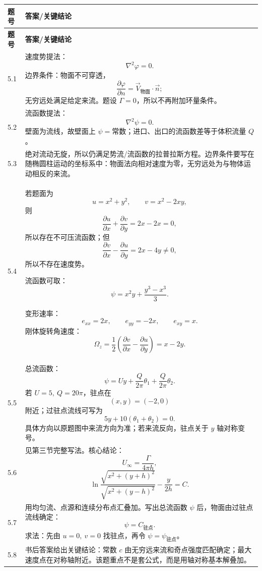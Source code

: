 ﻿\documentclass[UTF8,zihao=-4]{ctexart}
\begin{document}
\begin{longtable}{p{1.3cm}p{12.6cm}}
\toprule
\textbf{题号} & \textbf{答案/关键结论}\\
\midrule
\endfirsthead
\toprule
\textbf{题号} & \textbf{答案/关键结论}\\
\midrule
\endhead

5.1 &
速度势提法：
\[
\nabla^2\varphi=0.
\]
边界条件：物面不可穿透，
\[
\frac{\partial\varphi}{\partial n}=\vec V_{\text{物面}}\cdot\vec n;
\]
无穷远处满足给定来流。题设 $\Gamma=0$，所以不再附加环量条件。\\

5.2 &
流函数提法：
\[
\nabla^2\psi=0.
\]
壁面为流线，故壁面上 $\psi=\text{常数}$；进口、出口的流函数差等于体积流量 $Q$。\\

5.3 &
绝对流动无旋，所以仍满足势流/流函数的拉普拉斯方程。边界条件要写在随椭圆柱运动的坐标系中：物面法向相对速度为零，无穷远处为与物体运动相反的来流。\\

5.4 &
若题面为
\[
u=x^2+y^2,\qquad v=x^2-2xy,
\]
则
\[
\frac{\partial u}{\partial x}+\frac{\partial v}{\partial y}=2x-2x=0,
\]
所以存在不可压流函数；但
\[
\frac{\partial v}{\partial x}-\frac{\partial u}{\partial y}
=2x-4y\ne0,
\]
所以不存在速度势。

流函数可取：
\[
\psi=x^2y+\frac{y^3-x^3}{3}.
\]

变形速率：
\[
e_{xx}=2x,\qquad e_{yy}=-2x,\qquad e_{xy}=x.
\]
刚体旋转角速度：
\[
\Omega_z=\frac12\left(\frac{\partial v}{\partial x}-\frac{\partial u}{\partial y}\right)=x-2y.
\]\\

5.5 &
总流函数：
\[
\psi=Uy+\frac{Q}{2\pi}\theta_1+\frac{Q}{2\pi}\theta_2.
\]
若 $U=5,\ Q=20\pi$，驻点在
\[
(x,y)=(-2,0)
\]
附近；过驻点流线可写为
\[
5y+10(\theta_1+\theta_2)=0.
\]
具体方向以原题图中来流方向为准；若来流反向，驻点关于 $y$ 轴对称变号。\\

5.6 &
见第三节完整写法。核心结论：
\[
U_\infty=\frac{\Gamma}{4\pi h},
\]
\[
\ln\frac{\sqrt{x^2+(y+h)^2}}{\sqrt{x^2+(y-h)^2}}
-\frac{y}{2h}=C.
\]\\

5.7 &
用均匀流、点源和连续分布点汇叠加。写出总流函数 $\psi$ 后，物面由过驻点流线确定：
\[
\psi=C_{\text{驻点}}.
\]
求法：先由 $u=0,\ v=0$ 找驻点，再令 $\psi=\psi_{\text{驻点}}$。\\

5.8 &
书后答案给出关键结论：常数 $c$ 由无穷远来流和奇点强度匹配确定；最大速度点在对称轴附近。该题重点不是套公式，而是用轴对称基本解叠加。\\


\end{longtable}
\end{document}
